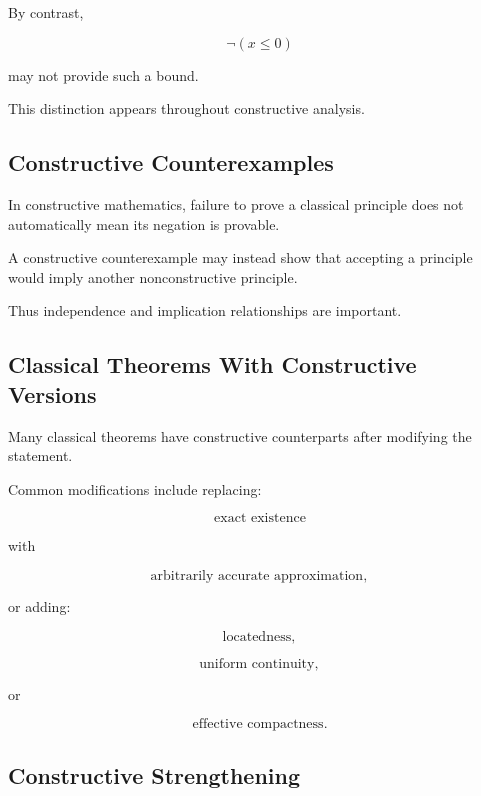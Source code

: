 By contrast,

\[
\boxed{
\neg(x\leq0)
}
\]

may not provide such a bound.

This distinction appears throughout constructive analysis.

\subsection{Constructive Counterexamples}
\label{subsec:constructive-counterexamples}

In constructive mathematics, failure to prove a classical principle does
not automatically mean its negation is provable.

A constructive counterexample may instead show that accepting a principle
would imply another nonconstructive principle.

Thus independence and implication relationships are important.

\subsection{Classical Theorems With Constructive Versions}
\label{subsec:classical-theorems-constructive-versions}

Many classical theorems have constructive counterparts after modifying the
statement.

Common modifications include replacing:

\[
\boxed{
\text{exact existence}
}
\]

with

\[
\boxed{
\text{arbitrarily accurate approximation},
}
\]

or adding:

\[
\boxed{
\text{locatedness},
}
\]

\[
\boxed{
\text{uniform continuity},
}
\]

or

\[
\boxed{
\text{effective compactness}.
}
\]

\subsection{Constructive Strengthening}
\label{subsec:constructive-strengthening}

